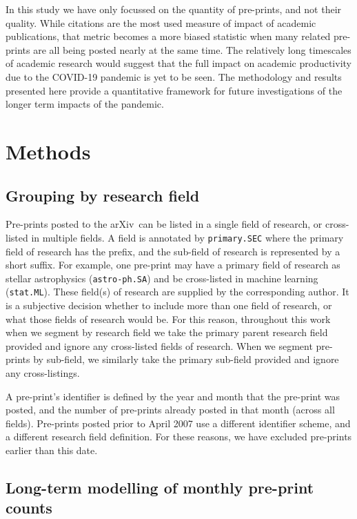 \documentclass[]{rsos}%
\newcommand{\arxiv}{arXiv}
\newcommand{\change}[1]{#1}
\begin{document}
In this study we have only focussed on the quantity of \change{pre-prints}, and not their quality. While citations are the most used measure of impact of academic publications, that metric becomes a more biased statistic when many related pre-prints are all being posted nearly at the same time\cite{Fassin:2021}. The relatively long timescales of academic research would suggest that the full impact on academic productivity due to the COVID-19 pandemic is yet to be seen. The methodology and results presented here provide a quantitative framework for future investigations of the longer term impacts of the pandemic.


\section*{Methods}

\subsection*{Grouping by research field}

Pre-prints posted to the \arxiv\ can be listed in a single field of research, or cross-listed in multiple fields. A field is annotated by \texttt{primary.SEC} where the primary field of research has the prefix, and the sub-field of research is represented by a short suffix. For example, one pre-print may have a primary field of research as stellar astrophysics (\texttt{astro-ph.SA}) and be cross-listed in machine learning (\texttt{stat.ML}). These field(s) of research are supplied by the corresponding author. It is a subjective decision whether to include more than one field of research, or what those fields of research would be. For this reason, throughout this work when we segment by research field we take the primary parent research field provided and ignore any cross-listed fields of research. When we segment pre-prints by sub-field, we similarly take the primary sub-field provided and ignore any cross-listings.

A pre-print's identifier is defined by the year and month that the pre-print was posted, and the number of pre-prints already posted in that month (across all fields). Pre-prints posted prior to April 2007 use a different identifier scheme, and a different research field definition. For these reasons, we have excluded pre-prints earlier than this date. 


\subsection*{Long-term modelling of monthly pre-print counts}
\end{document}
